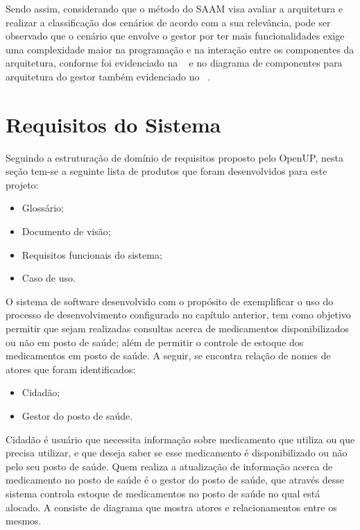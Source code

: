 Sendo assim, considerando que o método do \acrfull{SAAM} visa avaliar a arquitetura e realizar a classificação dos cenários de acordo com a sua relevância, pode ser observado que o cenário que envolve o gestor por ter mais funcionalidades exige uma complexidade maior na programação e na interação entre os componentes da arquitetura, conforme foi evidenciado na ~ e no diagrama de componentes para arquitetura do gestor também evidenciado no ~.


\section{Requisitos do Sistema}
\label{sec:visão do sistema}

Seguindo a estruturação de domínio de requisitos proposto pelo \acrfull{OpenUP}, nesta seção tem-se a seguinte lista de produtos que foram desenvolvidos para este projeto:
\begin{itemize}
    \item Glossário;
    \item Documento de visão;
    \item Requisitos funcionais do sistema;
    \item Caso de uso.
\end{itemize}

O sistema de software desenvolvido com o propósito de  exemplificar o uso do processo de desenvolvimento configurado no capítulo anterior, tem como objetivo permitir que sejam realizadas consultas acerca de medicamentos disponibilizados ou não em posto de saúde; além de permitir o controle de estoque dos medicamentos em posto de saúde. A seguir, se encontra relação de nomes de atores que foram identificados:

\begin{itemize}
    \item Cidadão;
    \item Gestor do posto de saúde.
\end{itemize}

Cidadão é usuário que necessita informação sobre medicamento que utiliza ou que precisa utilizar, e que deseja saber se esse medicamento é disponibilizado ou não pelo seu posto de saúde. Quem realiza a atualização de informação acerca de medicamento no posto de saúde é o gestor do posto de saúde, que através desse sistema controla estoque de medicamentos no posto de saúde no qual está alocado. A  consiste de diagrama que mostra atores e relacionamentos entre os mesmos.

